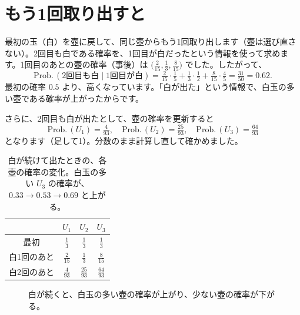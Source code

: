 \documentclass[a4paper,11pt,openany]{ltjsbook}
\newcommand{\Prob}{\mathrm{Prob.}\,}
\begin{document}
\section{もう1回取り出すと}

最初の玉（白）を壺に戻して、同じ壺からもう1回取り出します（壺は選び直さない）。2回目も白である確率を、1回目が白だったという情報を使って求めます。1回目のあとの壺の確率（事後）は $\bigl(\tfrac2{15},\tfrac13,\tfrac8{15}\bigr)$ でした。したがって、
\[
\Prob(2\text{回目も白}\mid1\text{回目が白})=\tfrac2{15}\cdot\tfrac15+\tfrac13\cdot\tfrac12+\tfrac8{15}\cdot\tfrac45=\tfrac{31}{50}=0.62 .
\]
最初の確率 $0.5$ より、高くなっています。「白が出た」という情報で、白玉の多い壺である確率が上がったからです。

さらに、2回目も白が出たとして、壺の確率を更新すると
\[
\Prob(U_1)=\tfrac4{93},\quad\Prob(U_2)=\tfrac{25}{93},\quad\Prob(U_3)=\tfrac{64}{93}
\]
となります（足して1）。分数のまま計算し直して確かめました。

\begin{table}[htbp]
\centering
\begin{tabular}{c|ccc}
\toprule
 & $U_1$ & $U_2$ & $U_3$\\
\midrule
最初 & $\tfrac13$ & $\tfrac13$ & $\tfrac13$\\
白1回のあと & $\tfrac2{15}$ & $\tfrac13$ & $\tfrac8{15}$\\
白2回のあと & $\tfrac4{93}$ & $\tfrac{25}{93}$ & $\tfrac{64}{93}$\\
\bottomrule
\end{tabular}
\caption{白が続けて出たときの、各壺の確率の変化。白玉の多い $U_3$ の確率が、$0.33\to0.53\to0.69$ と上がる。}
\end{table}

\begin{figure}[htbp]
\centering
{}
\caption{白が続くと、白玉の多い壺の確率が上がり、少ない壺の確率が下がる。}
\end{figure}
\end{document}
